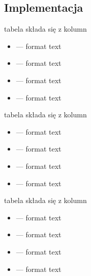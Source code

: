 \documentclass[letterpaper,10pt,polish]{sphinxmanual}
\begin{document}
\subsection{Implementacja }
\label{\detokenize{rozdzial3/index:implementacja-sqlite}}
\sphinxAtStartPar
tabela  składa się z kolumn
\begin{itemize}
\item {} 
\sphinxAtStartPar
{} — format text

\item {} 
\sphinxAtStartPar
{} — format text

\item {} 
\sphinxAtStartPar
{} — format text

\item {} 
\sphinxAtStartPar
{} — format text

\end{itemize}

\sphinxAtStartPar
tabela  składa się z kolumn
\begin{itemize}
\item {} 
\sphinxAtStartPar
{} — format text

\item {} 
\sphinxAtStartPar
{} — format text

\item {} 
\sphinxAtStartPar
{} — format text

\item {} 
\sphinxAtStartPar
{} — format text

\end{itemize}

\sphinxAtStartPar
tabela  składa się z kolumn
\begin{itemize}
\item {} 
\sphinxAtStartPar
{} — format text

\item {} 
\sphinxAtStartPar
{} — format text

\item {} 
\sphinxAtStartPar
{} — format text

\item {} 
\sphinxAtStartPar
{} — format text

\end{itemize}
\end{document}

